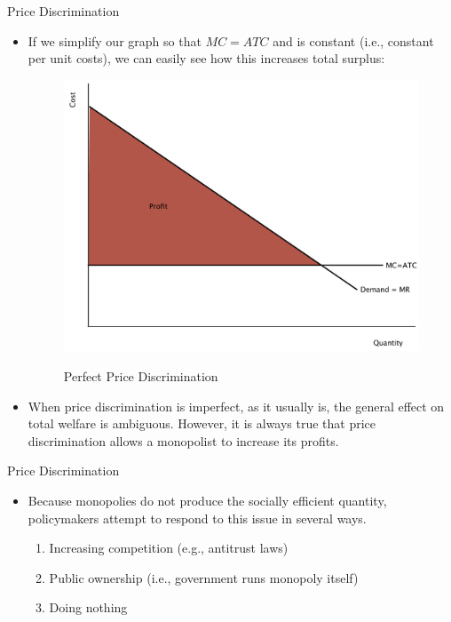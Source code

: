 \documentclass[xcolor={dvipsnames},pdf, hyperref={colorlinks=true, citecolor=ForestGreen, linkcolor=BlueViolet, urlcolor=Magenta}]{beamer}
\newcommand{\blank}[0]{}
\newcommand{\ddp}[1]{{\textcolor{ForestGreen}{#1}}}
\begin{document}
\begin{frame}{Price Discrimination}
\begin{itemize}
	\item If we simplify our graph so that $MC = ATC$ and is constant (i.e., constant per unit costs), we can easily see how this increases total surplus:
	
	\blank \blank \blank \blank
	\begin{figure}[H]
		\centering
	\ddp{	\includegraphics[scale=.2]{plot77.pdf}}
		\caption{Perfect Price Discrimination}
	\end{figure}
	\item When price discrimination is imperfect, as it usually is, the general effect on total welfare is ambiguous. However, it is always true that price discrimination allows a monopolist to increase its profits.
	
\end{itemize}
\end{frame}

\begin{frame}{Price Discrimination}
	\begin{itemize}
		\item 	Because monopolies do not produce the socially efficient quantity, policymakers attempt to respond to this issue in several ways.  
		
		\begin{enumerate}
			\item Increasing competition (e.g., antitrust laws)
		
			
			\item Public ownership (i.e., government runs monopoly itself)
			\item Doing nothing
		\end{enumerate}
	\end{itemize}
\end{frame}
\end{document}
